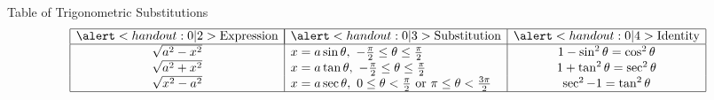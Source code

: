 \begin{frame}
Table of Trigonometric Substitutions
\[
\begin{array}{|c|l|c|}
\hline
\alert<handout:0| 2>{\textrm{Expression}} & \multicolumn{1}{|c|}{\alert<handout:0| 3>{\textrm{Substitution}}} & \alert<handout:0| 4>{\textrm{Identity}}\\
\hline
\sqrt{a^2-x^2} & x = a\sin \theta , \ -\frac{\pi}{2} \leq \theta \leq \frac{\pi}{2} & 1 - \sin^2 \theta = \cos^2 \theta\\
\sqrt{a^2+x^2} & x = a\tan \theta , \ -\frac{\pi}{2} \leq \theta \leq \frac{\pi}{2} & 1 + \tan^2 \theta = \sec^2 \theta\\
\sqrt{x^2-a^2} & x = a\sec \theta , \ 0 \leq \theta < \frac{\pi}{2} \ \textrm{or} \ \pi \leq \theta < \frac{3\pi}{2} & \sec^2 - 1 = \tan^2  \theta\\
\hline
\end{array}
\]
%
\end{frame}
